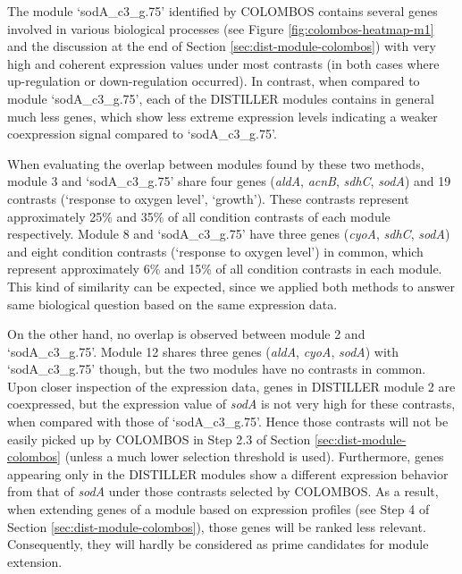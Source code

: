 The module `sodA\_c3\_g.75' identified by COLOMBOS contains several genes
involved in various biological processes (see
Figure \ref{fig:colombos-heatmap-m1} and the discussion at the end of Section
\ref{sec:dist-module-colombos}) with very high and coherent expression values
under most contrasts (in both cases where up-regulation or down-regulation
occurred). In contrast, when compared to module `sodA\_c3\_g.75', each of the
DISTILLER modules contains in general much less genes, which show less extreme
expression levels indicating a weaker coexpression signal compared to
`sodA\_c3\_g.75'.

When evaluating the overlap between modules found by these two methods, module
3 and `sodA\_c3\_g.75' share four genes (\textit{aldA}, \textit{acnB},
\textit{sdhC}, \textit{sodA}) and 19 contrasts (`response to oxygen level',
`growth').  These contrasts represent approximately 25\% and 35\% of all
condition contrasts of each module respectively. Module 8 and `sodA\_c3\_g.75'
have three genes (\textit{cyoA}, \textit{sdhC}, \textit{sodA}) and eight
condition contrasts (`response to oxygen level') in common, which represent
approximately 6\% and 15\% of all condition contrasts in each module.  This
kind of similarity can be expected, since we applied both methods to answer
same biological question based on the same expression data.

On the other hand, no overlap is observed between module 2 and
`sodA\_c3\_g.75'.  Module 12 shares three genes (\textit{aldA}, \textit{cyoA},
\textit{sodA}) with `sodA\_c3\_g.75' though, but the two modules have no
contrasts in common.  Upon closer inspection of the expression data, genes in
DISTILLER module 2 are coexpressed, but the expression value of \textit{sodA}
is not very high for these contrasts, when compared with those of
`sodA\_c3\_g.75'. Hence those contrasts will not be easily picked up by
COLOMBOS in Step 2.3 of Section \ref{sec:dist-module-colombos} (unless a much
lower selection threshold is used).  Furthermore, genes appearing only in the
DISTILLER modules show a different expression behavior from that of
\textit{sodA} under those contrasts selected by COLOMBOS.  As a result, when
extending genes of a module based on expression profiles (see Step 4 of Section
\ref{sec:dist-module-colombos}), those genes will be ranked less
relevant. Consequently, they will hardly be considered as prime candidates for
module extension.

